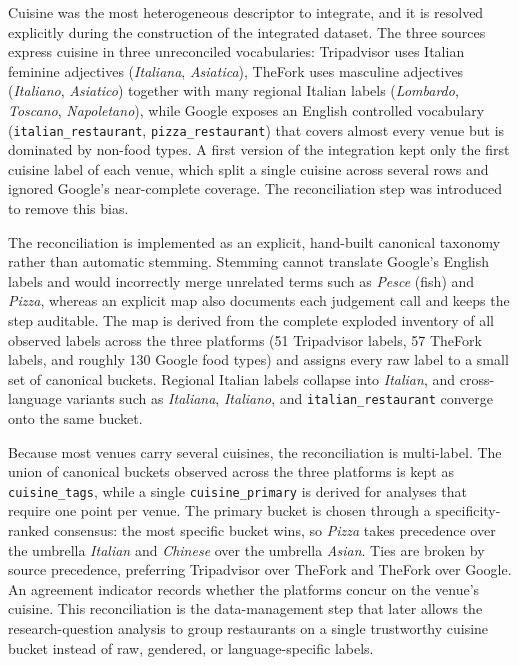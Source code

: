 Cuisine was the most heterogeneous descriptor to integrate, and it is resolved
explicitly during the construction of the integrated dataset. The three sources
express cuisine in three unreconciled vocabularies: Tripadvisor uses Italian
feminine adjectives (\textit{Italiana}, \textit{Asiatica}), TheFork uses masculine
adjectives (\textit{Italiano}, \textit{Asiatico}) together with many regional
Italian labels (\textit{Lombardo}, \textit{Toscano}, \textit{Napoletano}), while
Google exposes an English controlled vocabulary
(\texttt{italian\_restaurant}, \texttt{pizza\_restaurant}) that covers almost every
venue but is dominated by non-food types. A first version of the integration kept
only the first cuisine label of each venue, which split a single cuisine across
several rows and ignored Google's near-complete coverage. The reconciliation step
was introduced to remove this bias.

The reconciliation is implemented as an explicit, hand-built canonical taxonomy
rather than automatic stemming. Stemming cannot translate Google's English labels
and would incorrectly merge unrelated terms such as \textit{Pesce} (fish) and
\textit{Pizza}, whereas an explicit map also documents each judgement call and keeps
the step auditable. The map is derived from the complete exploded inventory of all
observed labels across the three platforms (51 Tripadvisor labels, 57 TheFork
labels, and roughly 130 Google food types) and assigns every raw label to a small
set of canonical buckets. Regional Italian labels collapse into \textit{Italian},
and cross-language variants such as \textit{Italiana}, \textit{Italiano}, and
\texttt{italian\_restaurant} converge onto the same bucket.

Because most venues carry several cuisines, the reconciliation is multi-label. The
union of canonical buckets observed across the three platforms is kept as
\texttt{cuisine\_tags}, while a single \texttt{cuisine\_primary} is derived for
analyses that require one point per venue. The primary bucket is chosen through a
specificity-ranked consensus: the most specific bucket wins, so \textit{Pizza}
takes precedence over the umbrella \textit{Italian} and \textit{Chinese} over the
umbrella \textit{Asian}. Ties are broken by source precedence, preferring
Tripadvisor over TheFork and TheFork over Google. An agreement indicator records
whether the platforms concur on the venue's cuisine. This reconciliation is the
data-management step that later allows the research-question analysis to group
restaurants on a single trustworthy cuisine bucket instead of raw, gendered, or
language-specific labels.

